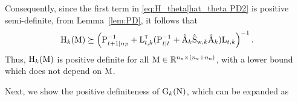 Consequently, since the first term in \eqref{eq:H_theta|hat_theta PD2} is positive semi-definite, from Lemma~\ref{lem:PD}, it follows that
\begin{align}
    \mxH_k(\mxM) 
        \succeq
        \left(\mxP_{t+1|\nD}^{-1} + \mxL_{t,k}^\tr (\mxP_{t|t}^{-1} + \hat{\mxA}_k \hat{\mxS}_{\vcw,k} \hat{\mxA}_k) \mxL_{t,k} \right)^{-1}.
\end{align}
Thus, ${ \mathrm{H} }_k({ \mathrm{M} })$ is positive definite for all ${ \mathrm{M} } \in {\mathbb{R}}^{n_{ \mathrm{x} } \times (n_{ \mathrm{x} } + n_{ \mathrm{u} })}$, with a lower bound which does not depend on ${ \mathrm{M} }$.

Next, we show the positive definiteness of ${ \mathrm{G} }_k({ \mathrm{N} })$, which can be expanded as
